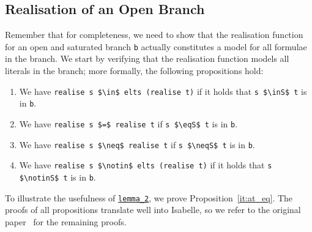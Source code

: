 \documentclass[sigplan,10pt,anonymous,review]{acmart}
\newcommand{\inS}{\in_\text{s}}
\newcommand{\notinS}{\notin_\text{s}}
\newcommand{\eqS}{=_\text{s}}
\newcommand{\neqS}{\neq_\text{s}}
\begin{document}
\subsection{Realisation of an Open Branch\label{sec:real}}
Remember that for completeness, we need to show that the realisation function for an open and saturated branch \lstinline!b! actually constitutes a model for all formulae in the branch.
We start by verifying that the realisation function models all literals in the branch; more formally, the following propositions hold:
\begin{enumerate}[label={(\roman*)}]
  \item\label{it:at_mem} We have \lstinline!realise s $\in$ elts (realise t)! if it holds that \lstinline!s $\inS$ t! is in \lstinline!b!. 
  \item\label{it:at_eq} We have \lstinline!realise s $=$ realise t! if \lstinline!s $\eqS$ t! is in \lstinline!b!.
  \item\label{it:af_eq} We have \lstinline!realise s $\neq$ realise t! if \lstinline!s $\neqS$ t! is in \lstinline!b!.
  \item\label{it:af_mem} We have \lstinline!realise s $\notin$ elts (realise t)! if it holds that \lstinline!s $\notinS$ t! is in \lstinline!b!. 
\end{enumerate}
To illustrate the usefulness of \hyperref[lst:lemma_2]{\lstinline!lemma_2!}, we prove Proposition~\ref{it:at_eq}.
The proofs of all propositions translate well into Isabelle, so we refer to the original paper~\cite{new_fast_tableau} for the remaining proofs. 
\end{document}
